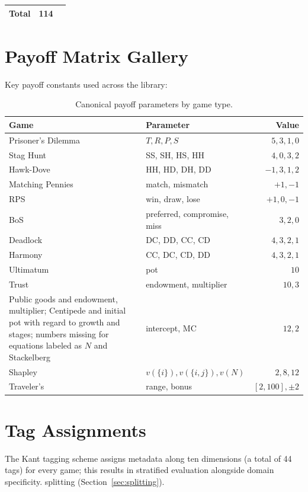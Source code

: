 \begin{table}[h]
\begin{tabular}{@{}lrp{6cm}@{}}
\midrule
\textbf{Total} & \textbf{114} & \\
\bottomrule
\end{tabular}
\end{table}

\section{Payoff Matrix Gallery}
\label{app:payoffs}

Key payoff constants used across the library:

\begin{table}[h]
\centering\small
\caption{Canonical payoff parameters by game type.}
\begin{tabular}{@{}llr@{}}
\toprule
\textbf{Game} & \textbf{Parameter} & \textbf{Value} \\
\midrule
Prisoner's Dilemma & $T, R, P, S$ & $5, 3, 1, 0$ \\
Stag Hunt & SS, SH, HS, HH & $4, 0, 3, 2$ \\
Hawk-Dove & HH, HD, DH, DD & $-1, 3, 1, 2$ \\
Matching Pennies & match, mismatch & $+1, -1$ \\
RPS & win, draw, lose & $+1, 0, -1$ \\
BoS & preferred, compromise, miss & $3, 2, 0$ \\
Deadlock & DC, DD, CC, CD & $4, 3, 2, 1$ \\
Harmony & CC, DC, CD, DD & $4, 3, 2, 1$ \\
Ultimatum & pot & $10$ \\
Trust & endowment, multiplier & $10, 3$ \\
Public goods and endowment, multiplier; Centipede and initial pot with regard to growth and stages; numbers missing for equations labeled as $N$ and
Stackelberg & intercept, MC & $12, 2$ \\
Shapley & $v(\{i\}), v(\{i,j\}), v(N)$ & $2, 8, 12$ \\
Traveler's & range, bonus & $[2,100], \pm 2$ \\
\bottomrule
\end{tabular}
\end{table}

\section{Tag Assignments}
\label{app:tags}

The Kant tagging scheme assigns metadata along ten dimensions (a total of 44 tags) for every game; this results in stratified evaluation alongside domain specificity.
splitting (Section~\ref{sec:splitting}).

